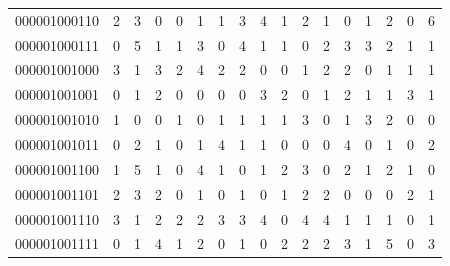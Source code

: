 \documentclass[10pt,a4paper]{article}
\begin{document}
\begin{longtable}{ |c|c|c|c|c|c|c|c|c|c|c|c|c|c|c|c|c| }
    000001000110              & 2                            & 3                                & 0                            & 0                              & 1   & 1   & 3   & 4   & 1   & 2   & 1   & 0   & 1   & 2   & 0   & 6   \\
    000001000111              & 0                            & 5                                & 1                            & 1                              & 3   & 0   & 4   & 1   & 1   & 0   & 2   & 3   & 3   & 2   & 1   & 1   \\
    000001001000              & 3                            & 1                                & 3                            & 2                              & 4   & 2   & 2   & 0   & 0   & 1   & 2   & 2   & 0   & 1   & 1   & 1   \\
    000001001001              & 0                            & 1                                & 2                            & 0                              & 0   & 0   & 0   & 3   & 2   & 0   & 1   & 2   & 1   & 1   & 3   & 1   \\
    000001001010              & 1                            & 0                                & 0                            & 1                              & 0   & 1   & 1   & 1   & 1   & 3   & 0   & 1   & 3   & 2   & 0   & 0   \\
    000001001011              & 0                            & 2                                & 1                            & 0                              & 1   & 4   & 1   & 1   & 0   & 0   & 0   & 4   & 0   & 1   & 0   & 2   \\
    000001001100              & 1                            & 5                                & 1                            & 0                              & 4   & 1   & 0   & 1   & 2   & 3   & 0   & 2   & 1   & 2   & 1   & 0   \\
    000001001101              & 2                            & 3                                & 2                            & 0                              & 1   & 0   & 1   & 0   & 1   & 2   & 2   & 0   & 0   & 0   & 2   & 1   \\
    000001001110              & 3                            & 1                                & 2                            & 2                              & 2   & 3   & 3   & 4   & 0   & 4   & 4   & 1   & 1   & 1   & 0   & 1   \\
    000001001111              & 0                            & 1                                & 4                            & 1                              & 2   & 0   & 1   & 0   & 2   & 2   & 2   & 3   & 1   & 5   & 0   & 3   \\

\end{longtable}
\end{document}
